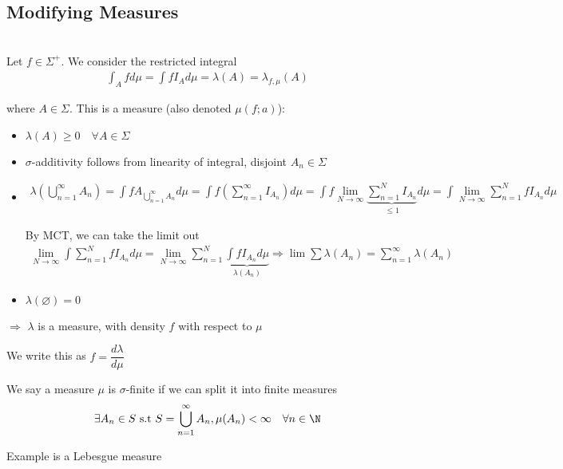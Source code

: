 \subsection{Modifying Measures}\hfill\\
Let $f\in\Sigma^+$. We consider the restricted integral
\begin{equation*}
  \begin{gathered}
    \int_A fd\mu = \int fI_A d\mu = \lambda(A) = \lambda_{f,\mu}(A)
  \end{gathered}
\end{equation*}\par
\noindent where $A\in\Sigma$. This is a measure (also denoted $\mu(f;a)$):\par
\begin{itemize}
  \item $\lambda(A)\geq0\quad\forall A\in\Sigma$
  \item $\sigma$-additivity follows from linearity of integral, disjoint $A_n\in\Sigma$
  \item 
    \begin{equation*}
      \begin{gathered}
        \lambda\left(\bigcup_{n=1}^{\infty}A_n\right) = \int fA_{\bigcup_{n=1}^{\infty}A_n}d\mu = \int f\left(\sum_{n=1}^{\infty}I_{A_n}\right)d\mu = \int f\lim_{N\to\infty}\underbrace{\sum_{n=1}^{N}I_{A_n}}_{\leq1}d\mu  = \int\lim_{N\to\infty}\sum_{n=1}^{N}fI_{A_n}d\mu
      \end{gathered}
    \end{equation*}
    \par\bigskip
    \noindent By MCT, we can take the limit out
    \begin{equation*}
      \begin{gathered}
        \lim_{N\to\infty}\int\sum_{n=1}^{N}fI_{A_n}d\mu = \lim_{N\to\infty}\sum_{n=1}^{N}\underbrace{\int fI_{A_n}d\mu}_{\lambda(A_n)} \Rightarrow \lim\sum\lambda(A_n)=\sum_{n=1}^{\infty}\lambda(A_n)
      \end{gathered}
    \end{equation*}
  \item $\lambda(\varnothing)=0$
\end{itemize}
\par\bigskip
\noindent $\Rightarrow$ $\lambda$ is a measure, with density $f$ with respect to $\mu$\par
\noindent We write this as $f = \dfrac{d\lambda}{d\mu}$
\par\bigskip
\begin{defo}{}
  We say a measure $\mu$ is $\sigma$-finite if we can split it into finite measures
  \begin{equation*}
    \begin{gathered}
      \exists A_n\in S\text{ s.t } S = \bigcup_{n=1}^{\infty}A_n, \mu(A_n)<\infty\quad\forall n\in \N
    \end{gathered}
  \end{equation*}\par
  \noindent Example is a Lebesgue measure
\end{defo}
